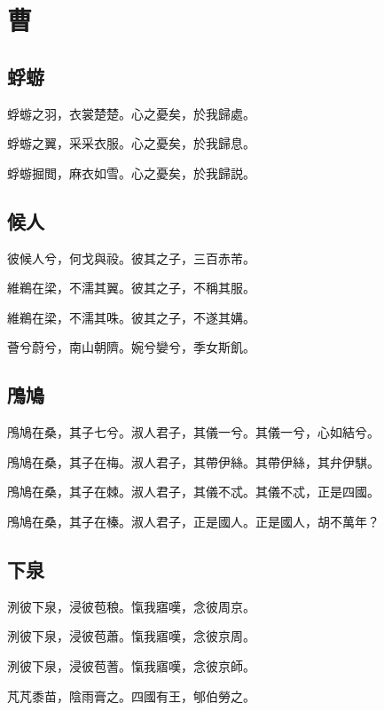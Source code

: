\section[曹]{曹}

\subsection[蜉蝣]{蜉蝣}

蜉蝣之羽，衣裳楚楚。心之憂矣，於我歸處。

蜉蝣之翼，采采衣服。心之憂矣，於我歸息。

蜉蝣掘閲，麻衣如雪。心之憂矣，於我歸説。

\subsection[候人]{候人}

彼候人兮，何戈與祋。彼其之子，三百赤芾。

維鵜在梁，不濡其翼。彼其之子，不稱其服。

維鵜在梁，不濡其咮。彼其之子，不遂其媾。

薈兮蔚兮，南山朝隮。婉兮孌兮，季女斯飢。

\subsection[鳲鳩]{鳲鳩}

鳲鳩在桑，其子七兮。淑人君子，其儀一兮。其儀一兮，心如結兮。

鳲鳩在桑，其子在梅。淑人君子，其帶伊絲。其帶伊絲，其弁伊騏。

鳲鳩在桑，其子在棘。淑人君子，其儀不忒。其儀不忒，正是四國。

鳲鳩在桑，其子在榛。淑人君子，正是國人。正是國人，胡不萬年？

\subsection[下泉]{下泉}

洌彼下泉，浸彼苞稂。愾我寤嘆，念彼周京。

洌彼下泉，浸彼苞蕭。愾我寤嘆，念彼京周。

洌彼下泉，浸彼苞蓍。愾我寤嘆，念彼京師。

芃芃黍苗，陰雨膏之。四國有王，郇伯勞之。
